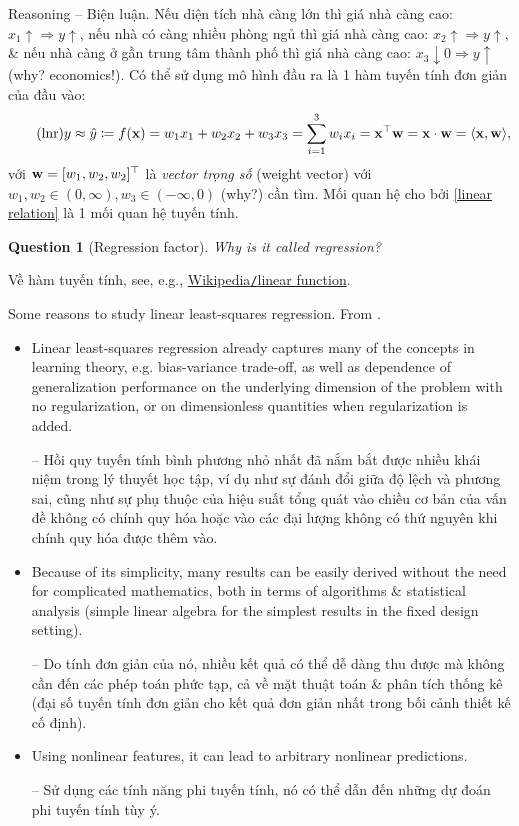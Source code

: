 \documentclass{article}
\newtheorem{question}{Question}
\begin{document}
{\sf Reasoning -- Biện luận.} Nếu diện tích nhà càng lớn thì giá nhà càng cao: $x_1\uparrow\Rightarrow y\uparrow$, nếu nhà có càng nhiều phòng ngủ thì giá nhà càng cao: $x_2\uparrow\Rightarrow y\uparrow$, \& nếu nhà càng ở gần trung tâm thành phố thì giá nhà càng cao: $x_3\downarrow0\Rightarrow y\uparrow$ (why? economics!). Có thể sử dụng mô hình đầu ra là 1 hàm tuyến tính đơn giản của đầu vào:
\begin{equation}
	\label{linear relation}
	\tag{lnr}
	y\approx\hat{y}\coloneqq f({\bf x}) = w_1x_1 + w_2x_2 + w_3x_3 = \sum_{i=1}^3 w_ix_i = {\bf x}^\top{\bf w} = {\bf x}\cdot{\bf w} = \langle{\bf x},{\bf w}\rangle,
\end{equation}
với ${\bf w} = [w_1,w_2,w_2]^\top$ là {\it vector trọng số} (weight vector) với $w_1,w_2\in(0,\infty),w_3\in(-\infty,0)$ (why?) cần tìm. Mối quan hệ cho bởi \eqref{linear relation} là 1 mối quan hệ tuyến tính.

\begin{question}[Regression factor]
	Why is it called \emph{regression}?
\end{question}
Về hàm tuyến tính, see, e.g., \href{https://en.wikipedia.org/wiki/Linear_function}{Wikipedia{\tt/}linear function}.

{\sf Some reasons to study linear least-squares regression.} From \cite[Sect. 3.1, pp. 45--46]{Bach2024}.
\begin{itemize}
	\item Linear least-squares regression already captures many of the concepts in learning theory, e.g. bias-variance trade-off, as well as dependence of generalization performance on the underlying dimension of the problem with no regularization, or on dimensionless quantities when regularization is added.
	
	-- Hồi quy tuyến tính bình phương nhỏ nhất đã nắm bắt được nhiều khái niệm trong lý thuyết học tập, ví dụ như sự đánh đổi giữa độ lệch và phương sai, cũng như sự phụ thuộc của hiệu suất tổng quát vào chiều cơ bản của vấn đề không có chính quy hóa hoặc vào các đại lượng không có thứ nguyên khi chính quy hóa được thêm vào.
	\item Because of its simplicity, many results can be easily derived without the need for complicated mathematics, both in terms of algorithms \& statistical analysis (simple linear algebra for the simplest results in the fixed design setting).
	
	-- Do tính đơn giản của nó, nhiều kết quả có thể dễ dàng thu được mà không cần đến các phép toán phức tạp, cả về mặt thuật toán \& phân tích thống kê (đại số tuyến tính đơn giản cho kết quả đơn giản nhất trong bối cảnh thiết kế cố định).
	\item Using nonlinear features, it can lead to arbitrary nonlinear predictions.
	
	-- Sử dụng các tính năng phi tuyến tính, nó có thể dẫn đến những dự đoán phi tuyến tính tùy ý.
\end{itemize}
\end{document}
